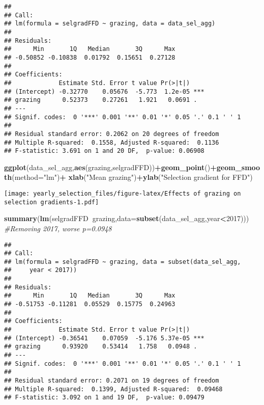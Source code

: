 \documentclass[]{article}
\newenvironment{Shaded}{\begin{snugshade}}{\end{snugshade}}
\newcommand{\KeywordTok}[1]{\textcolor[rgb]{0.13,0.29,0.53}{\textbf{#1}}}
\newcommand{\DataTypeTok}[1]{\textcolor[rgb]{0.13,0.29,0.53}{#1}}
\newcommand{\DecValTok}[1]{\textcolor[rgb]{0.00,0.00,0.81}{#1}}
\newcommand{\StringTok}[1]{\textcolor[rgb]{0.31,0.60,0.02}{#1}}
\newcommand{\CommentTok}[1]{\textcolor[rgb]{0.56,0.35,0.01}{\textit{#1}}}
\newcommand{\OperatorTok}[1]{\textcolor[rgb]{0.81,0.36,0.00}{\textbf{#1}}}
\newcommand{\NormalTok}[1]{#1}
\begin{document}
\begin{verbatim}
## 
## Call:
## lm(formula = selgradFFD ~ grazing, data = data_sel_agg)
## 
## Residuals:
##      Min       1Q   Median       3Q      Max 
## -0.50852 -0.10838  0.01792  0.15651  0.27128 
## 
## Coefficients:
##             Estimate Std. Error t value Pr(>|t|)    
## (Intercept) -0.32770    0.05676  -5.773  1.2e-05 ***
## grazing      0.52373    0.27261   1.921   0.0691 .  
## ---
## Signif. codes:  0 '***' 0.001 '**' 0.01 '*' 0.05 '.' 0.1 ' ' 1
## 
## Residual standard error: 0.2062 on 20 degrees of freedom
## Multiple R-squared:  0.1558, Adjusted R-squared:  0.1136 
## F-statistic: 3.691 on 1 and 20 DF,  p-value: 0.06908
\end{verbatim}

\begin{Shaded}
\begin{Highlighting}[]
\KeywordTok{ggplot}\NormalTok{(data_sel_agg,}\KeywordTok{aes}\NormalTok{(grazing,selgradFFD))}\OperatorTok{+}\KeywordTok{geom_point}\NormalTok{()}\OperatorTok{+}\KeywordTok{geom_smooth}\NormalTok{(}\DataTypeTok{method=}\StringTok{"lm"}\NormalTok{)}\OperatorTok{+}
\StringTok{  }\KeywordTok{xlab}\NormalTok{(}\StringTok{"Mean grazing"}\NormalTok{)}\OperatorTok{+}\KeywordTok{ylab}\NormalTok{(}\StringTok{"Selection gradient for FFD"}\NormalTok{)}
\end{Highlighting}
\end{Shaded}

\texttt{[image: yearly\_selection\_files/figure-latex/Effects of grazing on selection gradients-1.pdf]}

\begin{Shaded}
\begin{Highlighting}[]
\KeywordTok{summary}\NormalTok{(}\KeywordTok{lm}\NormalTok{(selgradFFD}\OperatorTok{~}\NormalTok{grazing,}\DataTypeTok{data=}\KeywordTok{subset}\NormalTok{(data_sel_agg,year}\OperatorTok{<}\DecValTok{2017}\NormalTok{))) }\CommentTok{#Removing 2017, worse p=0.0948 }
\end{Highlighting}
\end{Shaded}

\begin{verbatim}
## 
## Call:
## lm(formula = selgradFFD ~ grazing, data = subset(data_sel_agg, 
##     year < 2017))
## 
## Residuals:
##      Min       1Q   Median       3Q      Max 
## -0.51753 -0.11281  0.05529  0.15775  0.24963 
## 
## Coefficients:
##             Estimate Std. Error t value Pr(>|t|)    
## (Intercept) -0.36541    0.07059  -5.176 5.37e-05 ***
## grazing      0.93920    0.53414   1.758   0.0948 .  
## ---
## Signif. codes:  0 '***' 0.001 '**' 0.01 '*' 0.05 '.' 0.1 ' ' 1
## 
## Residual standard error: 0.2071 on 19 degrees of freedom
## Multiple R-squared:  0.1399, Adjusted R-squared:  0.09468 
## F-statistic: 3.092 on 1 and 19 DF,  p-value: 0.09479
\end{verbatim}
\end{document}
